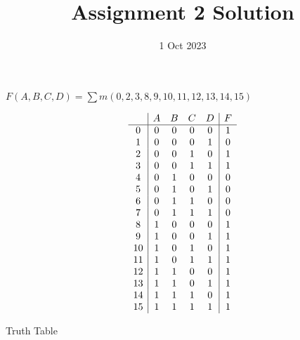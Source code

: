 \documentclass{vhdl-assignment}
\title{Assignment 2 Solution}
\date{1 Oct 2023}
\begin{document}
\maketitle
\thispagestyle{fancy}

\begin{problem}{}
    $F(A,B,C,D)=\sum m(0,2,3,8,9,10,11,12,13,14,15)$
    
    \begin{table}[H]
        \centering
        \begin{displaymath}
            \begin{array}{c|c c c c|c}
                  & A & B & C & D & F \\
                \hline
                0  & 0 & 0 & 0 & 0 & 1 \\
                1  & 0 & 0 & 0 & 1 & 0 \\
                2  & 0 & 0 & 1 & 0 & 1 \\
                3  & 0 & 0 & 1 & 1 & 1 \\
                4  & 0 & 1 & 0 & 0 & 0 \\
                5  & 0 & 1 & 0 & 1 & 0 \\
                6  & 0 & 1 & 1 & 0 & 0 \\
                7  & 0 & 1 & 1 & 1 & 0 \\
                8  & 1 & 0 & 0 & 0 & 1 \\
                9  & 1 & 0 & 0 & 1 & 1 \\
                10 & 1 & 0 & 1 & 0 & 1 \\
                11 & 1 & 0 & 1 & 1 & 1 \\
                12 & 1 & 1 & 0 & 0 & 1 \\
                13 & 1 & 1 & 0 & 1 & 1 \\
                14 & 1 & 1 & 1 & 0 & 1 \\
                15 & 1 & 1 & 1 & 1 & 1 \\
            \end{array}
        \end{displaymath}
        \caption[short]{Truth Table}
    \end{table}
    

\end{problem}
\end{document}
